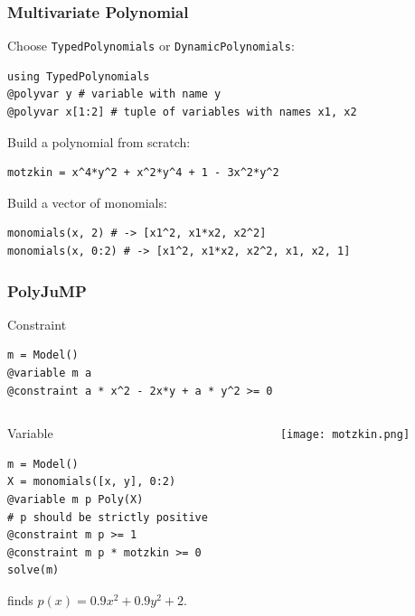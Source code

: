 \documentclass{beamer}
\begin{document}
  \begin{frame}[fragile]
    \frametitle{Multivariate Polynomial}
    Choose \verb|TypedPolynomials| or \verb|DynamicPolynomials|:
\begin{verbatim}
using TypedPolynomials
@polyvar y # variable with name y
@polyvar x[1:2] # tuple of variables with names x1, x2
\end{verbatim}
    Build a polynomial from scratch:
\begin{verbatim}
motzkin = x^4*y^2 + x^2*y^4 + 1 - 3x^2*y^2
\end{verbatim}
    Build a vector of monomials:
\begin{verbatim}
monomials(x, 2) # -> [x1^2, x1*x2, x2^2]
monomials(x, 0:2) # -> [x1^2, x1*x2, x2^2, x1, x2, 1]
\end{verbatim}
  \end{frame}
  \begin{frame}[fragile]
    \frametitle{PolyJuMP}
    \begin{block}{Constraint}
\begin{verbatim}
m = Model()
@variable m a
@constraint a * x^2 - 2x*y + a * y^2 >= 0
\end{verbatim}
    \end{block}
      \vspace{-1em}
    \begin{columns}
      \begin{column}{0.6\textwidth}
    \begin{block}{Variable}
      \vspace{-.5em}
\begin{verbatim}
m = Model()
X = monomials([x, y], 0:2)
@variable m p Poly(X)
# p should be strictly positive
@constraint m p >= 1
@constraint m p * motzkin >= 0
solve(m)
\end{verbatim}
      \vspace{-.5em}
    finds $p(x) = 0.9x^2 + 0.9y^2 + 2$.
    \end{block}
      \end{column}
      \begin{column}{0.4\textwidth}
        \centering
        \texttt{[image: motzkin.png]}
      \end{column}
    \end{columns}
  \end{frame}
\end{document}
